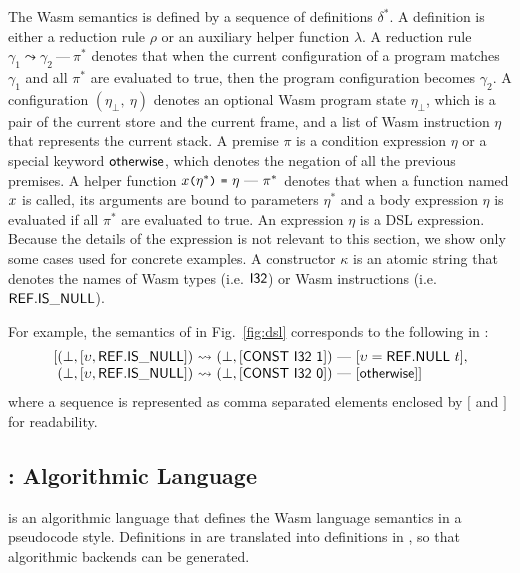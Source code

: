 The Wasm semantics is defined by a sequence of definitions $\delta^*$.
A definition is either a reduction rule $\rho$ or an auxiliary helper function $\lambda$.
A reduction rule $\gamma_1 \leadsto \gamma_2\ \mbox{---}\ \pi^*$ denotes that
when the current configuration of a program matches $\gamma_1$ and
all $\pi^*$ are evaluated to true, then the program configuration becomes $\gamma_2$.
A configuration $(\eta_\bot,\ \eta)$ denotes an optional Wasm program state $\eta_\bot$,
which is a pair of the current store and the current frame,
and a list of Wasm instruction $\eta$ that represents the current stack.
A premise $\pi$ is a condition expression $\eta$ or a special keyword
\ensuremath{\mathsf{\small otherwise}},
which denotes the negation of all the previous premises.
A helper function $x \texttt{\small (} \eta^* \texttt{\small )}\ \texttt{\small =}\ \eta\ \mbox{---}\ \pi^*$ denotes that
when a function named $x$ is called, its arguments are bound to parameters $\eta^*$
and a body expression $\eta$ is evaluated if all $\pi^*$ are evaluated to true.
An expression $\eta$ is a DSL expression.
Because the details of the expression is not relevant to this section,
we show only some cases used for concrete
examples.
A constructor $\kappa$ is an atomic string that denotes the names of
Wasm types (i.e. $\mathsf{I32}$) or Wasm instructions (i.e. $\mathsf{REF.IS\_NULL}$).

For example, the semantics of 
in Fig.~\ref{fig:dsl} corresponds to the following in \dl:
\[
\begin{array}{l@{}l@{~}c@{~}l}
[&(\bot, [\upsilon, \ssf{REF.IS\_NULL}]) &\leadsto& (\bot, [\ssf{CONST\ I32\ 1}])\
\mbox{---}\ [\upsilon = \ssf{REF.NULL}\ t],\\
&(\bot, [\upsilon, \ssf{REF.IS\_NULL}])&\leadsto&(\bot, [\ssf{CONST\ I32\ 0}])\
\mbox{---}\ [\ssf{\small otherwise}] ]
\end{array}
\]
where a sequence is represented as comma separated elements
enclosed by $[$ and $]$ for readability.

\subsection{\al: Algorithmic Language}\label{sec:aldef}
\al is an algorithmic language that defines the Wasm language semantics in a pseudocode style.
Definitions in \dl are translated into definitions in \al,
so that algorithmic backends can be generated.


